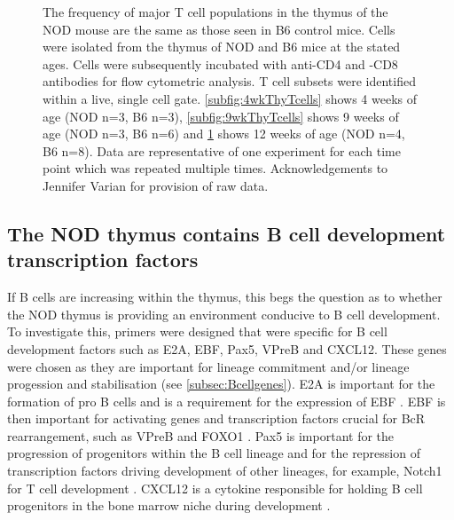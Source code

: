\begin{figure}
\begin{subfigure}{0.5\textwidth}
	\label{subfig:12wkThyTcells}
	\end{subfigure}
\caption[Major T cell subtypes are normal in the NOD mouse thymus]{The frequency of major T cell populations in the thymus of the NOD mouse are the same as those seen in B6 control mice. 
Cells were isolated from the thymus of NOD and B6 mice at the stated ages.
Cells were subsequently incubated with anti-CD4 and -CD8 antibodies for flow cytometric analysis.
T cell subsets were identified within a live, single cell gate.
\ref{subfig:4wkThyTcells} shows 4 weeks of age (NOD n=3, B6 n=3), \ref{subfig:9wkThyTcells} shows 9 weeks of age (NOD n=3, B6 n=6) and \ref{subfig:12wkThyTcells} shows 12 weeks of age (NOD n=4, B6 n=8).
Data are representative of one experiment for each time point which was repeated multiple times.
Acknowledgements to Jennifer Varian for provision of raw data.}
\label{fig:NODB6Tcells}
\end{figure}


\subsection{The NOD thymus contains B cell development transcription factors}
\label{subsec:TFs}



If B cells are increasing within the thymus, this begs the question as to whether the NOD thymus is providing an environment conducive to B cell development. 
To investigate this, primers were designed that were specific for B cell development factors such as E2A, EBF, Pax5, VPreB and CXCL12.
These genes were chosen as they are important for lineage commitment and/or lineage progession and stabilisation (see \cref{subsec:Bcellgenes}).
E2A is important for the formation of pro B cells and is a requirement for the expression of EBF \citep{Welinder2011}.
EBF is then important for activating genes and transcription factors crucial for BcR rearrangement, such as VPreB and FOXO1 \citep{Amin2008}.
Pax5 is important for the progression of progenitors within the B cell lineage and for the repression of transcription factors driving development of other lineages, for example, Notch1 for T cell development \citep{Welinder2011, Souabni2002}.
CXCL12 is a cytokine responsible for holding B cell progenitors in the bone marrow niche during development \citep{Tokoyoda2004}.

